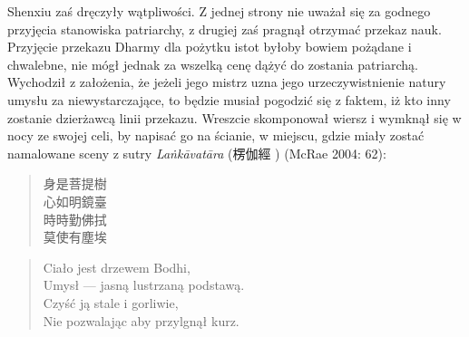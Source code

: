 Shenxiu zaś dręczyły wątpliwości. Z jednej strony nie uważał się za godnego przyjęcia stanowiska patriarchy, z drugiej zaś pragnął otrzymać przekaz nauk.
Przyjęcie przekazu Dharmy dla pożytku istot byłoby bowiem pożądane i chwalebne, nie mógł jednak za wszelką cenę dążyć do zostania patriarchą.
Wychodził z założenia, że jeżeli jego mistrz uzna jego urzeczywistnienie natury umysłu za niewystarczające, to będzie musiał pogodzić się z faktem, iż kto inny zostanie dzierżawcą linii przekazu.
Wreszcie skomponował wiersz i wymknął się w nocy ze swojej celi, by napisać go na ścianie, w miejscu, gdzie miały zostać namalowane sceny z sutry \textit{La\.nkāvatāra} (楞伽經 ) (McRae 2004: 62):

\vspace*{6pt}
\begin{minipage}[t]{0.4\textwidth}
\begin{verse}
身是菩提樹\\
心如明鏡臺\\
時時勤佛拭\\
莫使有塵埃
\end{verse}
\end{minipage}
\begin{minipage}[t]{0.6\textwidth}
\itshape
\begin{verse}
Ciało jest drzewem Bodhi,\\
Umysł --- jasną lustrzaną podstawą.\\
Czyść ją stale i gorliwie,\\
Nie pozwalając aby przylgnął kurz.\fnm
\end{verse}
\end{minipage}
\label{ShenxiuVerse}
\vspace*{6pt}

